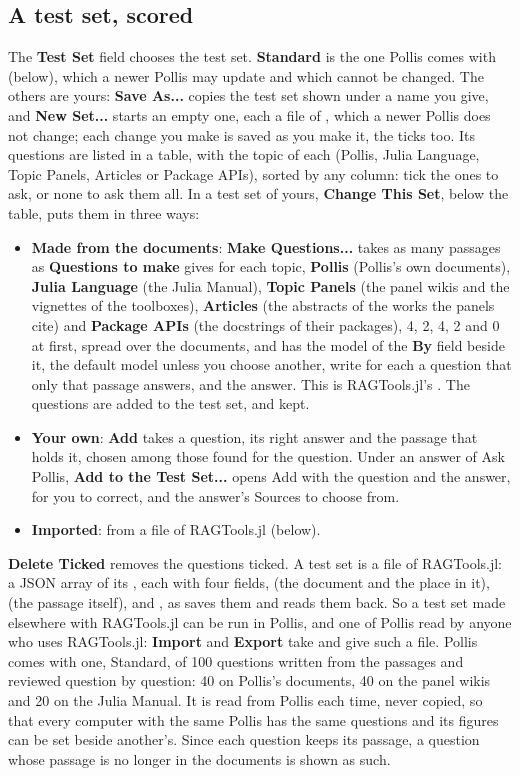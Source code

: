 \subsection{A test set, scored}
The \textbf{Test Set} field chooses the test set. \textbf{Standard} is the one Pollis comes with (below), which a newer
Pollis may update and which cannot be changed. The others are yours: \textbf{Save As...} copies the test set shown
under a name you give, and \textbf{New Set...} starts an empty one, each a file of , which
a newer Pollis does not change; each change you make is saved as you make it, the ticks too. Its questions are listed in a table, with the topic of each (Pollis, Julia Language, Topic Panels, Articles or Package APIs), sorted by any column: tick the ones to ask, or none to
ask them all. In a test set of yours, \textbf{Change This Set}, below the table, puts them in three ways:
\begin{itemize}
  \item \textbf{Made from the documents}: \textbf{Make Questions...} takes as many passages as \textbf{Questions to make} gives for each topic,
    \textbf{Pollis} (Pollis's own documents), \textbf{Julia Language} (the Julia Manual), \textbf{Topic Panels} (the
    panel wikis and the vignettes of the toolboxes), \textbf{Articles} (the abstracts of the works the panels cite)
    and \textbf{Package APIs} (the docstrings of their packages), 4, 2, 4, 2 and 0 at first, spread over the documents, and has the model of the \textbf{By} field beside it, the default model unless you choose another, write for each a
    question that only that passage answers, and the answer. This is RAGTools.jl's . The
    questions are added to the test set, and kept.
  \item \textbf{Your own}: \textbf{Add} takes a question, its right answer and the passage that holds it, chosen among
    those found for the question. Under an answer of Ask Pollis, \textbf{Add to the Test Set...} opens Add with the
    question and the answer, for you to correct, and the answer's Sources to choose from.
  \item \textbf{Imported}: from a file of RAGTools.jl (below).
\end{itemize}
\textbf{Delete Ticked} removes the questions ticked.
A test set is a file of RAGTools.jl: a JSON array of its , each with four
fields,  (the document and the place in it),  (the passage itself),  and
, as  saves them and  reads them back. So a
test set made elsewhere with RAGTools.jl can be run in Pollis, and one of Pollis read by anyone who uses RAGTools.jl:
\textbf{Import} and \textbf{Export} take and give such a file. Pollis comes with one, Standard, of 100 questions
written from the passages and reviewed question by question: 40 on Pollis's documents, 40 on the panel wikis and 20
on the Julia Manual. It is read from Pollis each time, never copied, so that every computer with the same Pollis has
the same questions and its figures can be set beside another's. Since each question keeps its passage, a question whose
passage is no longer in the documents is shown as such.

